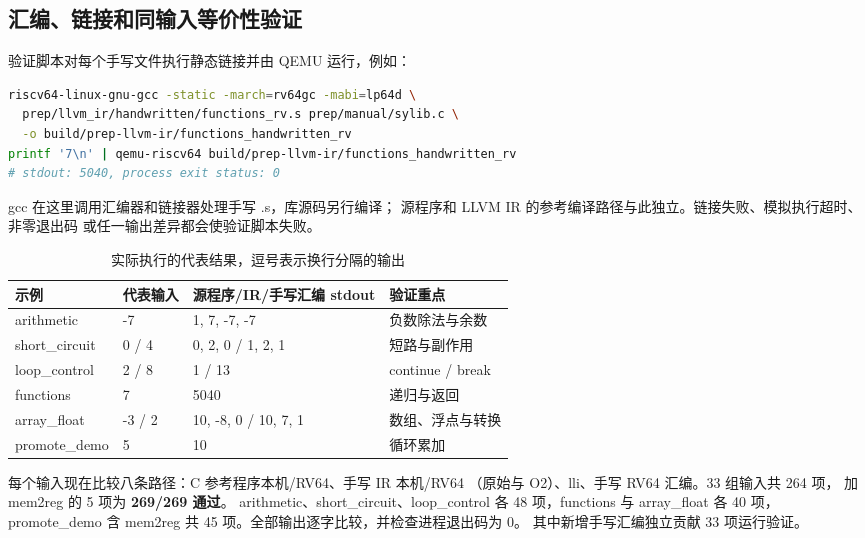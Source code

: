 \documentclass[UTF8,a4paper,11pt]{ctexart}
\begin{document}
\subsection{汇编、链接和同输入等价性验证}
验证脚本对每个手写文件执行静态链接并由 QEMU 运行，例如：
\par\vspace{0.7\baselineskip}\noindent\begin{minipage}[t]{\linewidth}
\begin{lstlisting}[language=bash]
riscv64-linux-gnu-gcc -static -march=rv64gc -mabi=lp64d \
  prep/llvm_ir/handwritten/functions_rv.s prep/manual/sylib.c \
  -o build/prep-llvm-ir/functions_handwritten_rv
printf '7\n' | qemu-riscv64 build/prep-llvm-ir/functions_handwritten_rv
# stdout: 5040, process exit status: 0
\end{lstlisting}
\end{minipage}\par\vspace{0.5\baselineskip}
gcc 在这里调用汇编器和链接器处理手写 .s，库源码另行编译；
源程序和 LLVM IR 的参考编译路径与此独立。链接失败、模拟执行超时、非零退出码
或任一输出差异都会使验证脚本失败。

\begin{table}[htbp]
\centering\small
\begin{tabular}{llll}
\toprule
示例 & 代表输入 & 源程序/IR/手写汇编 stdout & 验证重点\\
\midrule
arithmetic & -7 & 1, 7, -7, -7 & 负数除法与余数\\
short\_circuit & 0 / 4 & 0, 2, 0 / 1, 2, 1 & 短路与副作用\\
loop\_control & 2 / 8 & 1 / 13 & continue / break\\
functions & 7 & 5040 & 递归与返回\\
array\_float & -3 / 2 & 10, -8, 0 / 10, 7, 1 & 数组、浮点与转换\\
promote\_demo & 5 & 10 & 循环累加\\
\bottomrule
\end{tabular}
\caption{实际执行的代表结果，逗号表示换行分隔的输出}
\end{table}

每个输入现在比较八条路径：C 参考程序本机/RV64、手写 IR 本机/RV64
（原始与 O2）、lli、手写 RV64 汇编。33 组输入共 264 项，
加 mem2reg 的 5 项为 \textbf{269/269 通过}。
arithmetic、short\_circuit、loop\_control 各 48 项，functions 与 array\_float 各 40 项，
promote\_demo 含 mem2reg 共 45 项。全部输出逐字比较，并检查进程退出码为 0。
其中新增手写汇编独立贡献 33 项运行验证。
\end{document}
